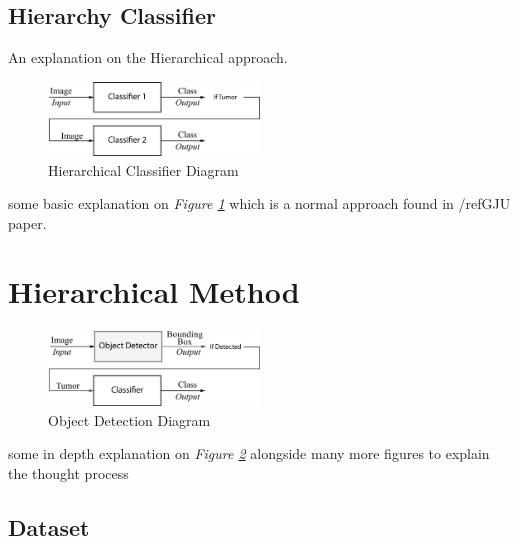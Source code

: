 \documentclass[12pt]{extarticle}
\begin{document}
	\subsection{Hierarchy Classifier}
	An explanation on the Hierarchical approach.
	\begin{figure}[h]
		\centering
		\includegraphics[width=0.5\textwidth]{pics/Figures/Hierarchical_Classifier_Block_Diagram.eps}
		\caption{\small{Hierarchical Classifier Diagram}}
		\label{fig:Hierarchical Classifier}
	\end{figure}
	some basic explanation on \emph{Figure \ref{fig:Hierarchical Classifier}} which is a normal approach found in /ref{GJU paper}.
	\newpage
	
	
	\section{Hierarchical Method}\label{Meth}
	
	\begin{figure}[h]
		\centering
		\includegraphics[width=0.5\textwidth]{pics/Figures/Hierarchical_Obj_Det_Block_Diagram.eps}
		\caption{\small{Object Detection Diagram}}
		\label{fig:Hierarchical Obj Detector}
	\end{figure}
	some in depth explanation on \emph{Figure \ref{fig:Hierarchical Obj Detector}} alongside many more figures to explain the thought process 
	\subsection{Dataset}\label{Data}
	
\end{document}

